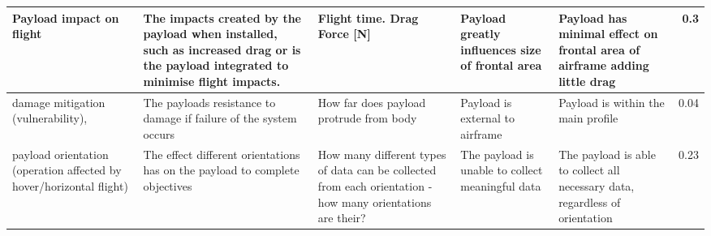 \begin{table}[H]
{\begin{tabular}{|p{2cm}|p{4cm}|p{4cm}|p{4cm}|p{4cm}|r|}
Payload impact on flight                                            & The impacts created by the payload when installed, such as increased drag or is the payload integrated to minimise flight impacts.                            & Flight time. Drag Force {[}N{]}                                                                                  & Payload greatly influences size of frontal area                              & Payload has minimal effect on frontal area of airframe adding little drag                      & 0.3       \\ \hline
damage mitigation (vulnerability),                                  & The payloads resistance to damage if failure of the system occurs                                                                                             & How far does payload protrude from body                                                                          & Payload is external to airframe                                              & Payload is within the main profile                                                             & 0.04      \\ \hline
payload orientation (operation affected by hover/horizontal flight) & The effect different orientations has on the payload to complete objectives                                                                                   & How many different types of data can be collected from each orientation - how many orientations are their?       & The payload is unable to collect meaningful data                             & The payload is able to collect all necessary data, regardless of orientation                   & 0.23      \\ \hline
\end{tabular}%
}
\end{table}






